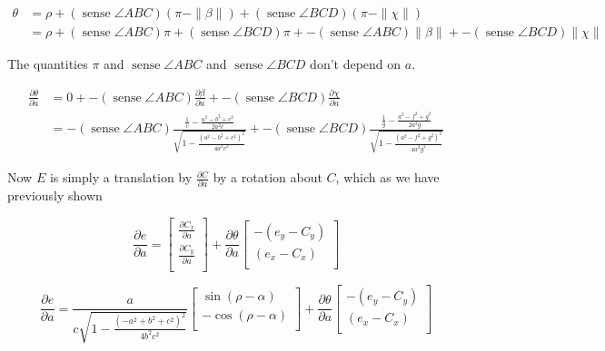 \documentclass[11pt]{article}
\DeclareMathOperator{\sense}{sense}
\begin{document}
\begin{align*}
\theta &= \rho + (\sense{\angle ABC})(\pi - \|\beta\|) + (\sense{\angle BCD})(\pi -\|\chi\|) \\
&= \rho + (\sense{\angle ABC})\pi + (\sense{\angle BCD})\pi +  - (\sense{\angle ABC})\|\beta\|  + - (\sense{\angle BCD})\|\chi\|
\end{align*}

The quantities $\pi$ and $\sense{\angle ABC}$ and $\sense{\angle BCD}$ don't depend on $a$.

\begin{align*}
\frac{\partial \theta}{\partial a} &= 0 + - (\sense{\angle ABC}) \frac{\partial \beta}{\partial a} +
- (\sense{\angle BCD})\frac{\partial \chi}{\partial a}  \\
&= - (\sense{\angle ABC}) \frac{\frac{1}{c} - \frac{a^2 - b^2 + c^2}{2 a^2 c}}
{\sqrt{1 - \frac{(a^2 - b^2 + c^2)^2}{4 a^2 c^2}}}
+ - (\sense{\angle BCD})\frac{\frac{1}{g} - \frac{a^2 - f^2 + g^2}{2 a^2 g}}
{\sqrt{1 - \frac{(a^2 - f^2 + g^2)^2}{4 a^2 g^2}}}
\end{align*}

Now $E$ is simply a translation by $\frac{\partial C}{\partial a}$ by a rotation
about $C$, which as we have previously shown

\[
\frac{\partial e}{\partial  a} = 
\begin{bmatrix}
  \frac{\partial C_x}{\partial a}  \\
  \frac{\partial C_y}{\partial a} \\
  \end{bmatrix}
+
\frac{\partial \theta}{\partial a} 
\begin{bmatrix}
           -(e_y -C_y)  \\
           (e_x - C_x )  \\
         \end{bmatrix}
\]

\[
\frac{\partial e}{\partial  a} =
\frac{a}{c \sqrt{1 - \frac{(-a^2 + b^2 + c^2)^2}{4 b^2 c^2}}}
\begin{bmatrix}
 \sin{(\rho - \alpha)}  \\
- \cos{(\rho - \alpha)}  \\
\end{bmatrix}
+
\frac{\partial \theta}{\partial a} 
\begin{bmatrix}
           -(e_y -C_y)  \\
           (e_x - C_x )  \\
         \end{bmatrix}
\]
\end{document}
